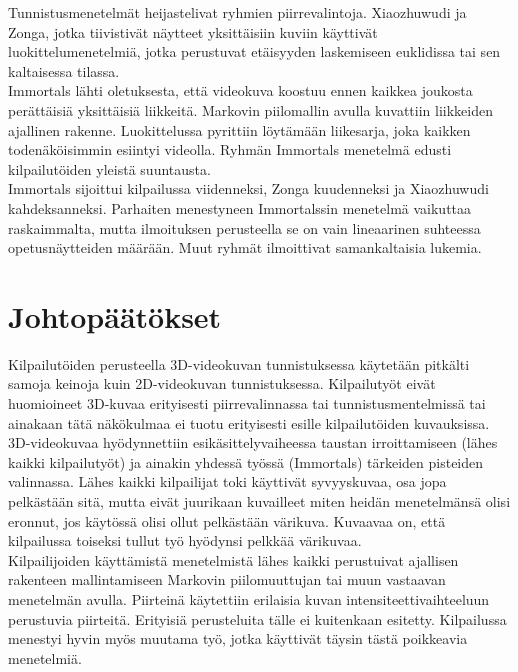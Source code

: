 Tunnistusmenetelmät heijastelivat ryhmien piirrevalintoja. Xiaozhuwudi ja Zonga, jotka tiivistivät näytteet 
yksittäisiin kuviin käyttivät luokittelumenetelmiä, jotka perustuvat etäisyyden laskemiseen 
euklidissa tai sen kaltaisessa tilassa. \\

Immortals lähti oletuksesta, että videokuva koostuu ennen kaikkea joukosta perättäisiä yksittäisiä liikkeitä.
Markovin piilomallin avulla kuvattiin liikkeiden ajallinen rakenne. Luokittelussa pyrittiin löytämään 
liikesarja, joka kaikken todenäköisimmin esiintyi videolla. Ryhmän Immortals menetelmä edusti kilpailutöiden yleistä suuntausta.\\

Immortals sijoittui kilpailussa viidenneksi, Zonga kuudenneksi ja Xiaozhuwudi kahdeksanneksi. Parhaiten menestyneen Immortalssin
menetelmä vaikuttaa raskaimmalta, mutta ilmoituksen perusteella se on vain lineaarinen suhteessa opetusnäytteiden määrään.
Muut ryhmät ilmoittivat samankaltaisia lukemia.


\section {Johtopäätökset}

Kilpailutöiden perusteella 3D-videokuvan tunnistuksessa käytetään pitkälti samoja keinoja kuin 2D-videokuvan tunnistuksessa. Kilpailutyöt eivät huomioineet
3D-kuvaa erityisesti piirrevalinnassa tai tunnistusmentelmissä tai ainakaan tätä näkökulmaa ei tuotu erityisesti
esille kilpailutöiden kuvauksissa. 3D-videokuvaa hyödynnettiin esikäsittelyvaiheessa taustan irroittamiseen 
(lähes kaikki kilpailutyöt) ja ainakin yhdessä työssä (Immortals) tärkeiden pisteiden valinnassa. 
Lähes kaikki kilpailijat toki käyttivät syvyyskuvaa, osa jopa pelkästään sitä, mutta eivät juurikaan
kuvailleet miten heidän menetelmänsä olisi eronnut, jos käytössä olisi ollut pelkästään värikuva.
Kuvaavaa on, että kilpailussa toiseksi tullut työ hyödynsi pelkkää värikuvaa.\\

Kilpailijoiden käyttämistä menetelmistä lähes kaikki perustuivat ajallisen rakenteen mallintamiseen 
Markovin piilomuuttujan tai muun vastaavan menetelmän avulla. Piirteinä käytettiin erilaisia kuvan intensiteettivaihteeluun perustuvia piirteitä. Erityisiä perusteluita tälle ei kuitenkaan esitetty.
Kilpailussa menestyi hyvin myös muutama työ, jotka käyttivät täysin tästä poikkeavia menetelmiä.\\

